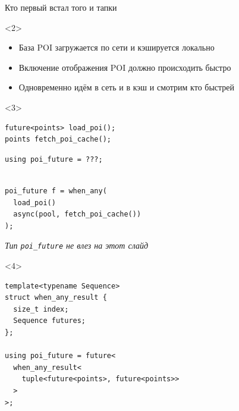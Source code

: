 \documentclass[aspectratio=169,hyperref={unicode},17pt]{beamer}
\begin{document}
\begin{frame}[fragile,t]{Кто первый встал того и тапки}
\begin{onlyenv}<2>
\begin{itemize}
 \item База POI загружается по сети и кэшируется локально
 \item Включение отображения POI должно происходить быстро
 \item Одновременно идём в сеть и в кэш и смотрим кто быстрей
\end{itemize}
\end{onlyenv}
\begin{onlyenv}<3>
\begin{lstlisting}[style=cppcode,aboveskip=0pt,belowskip=0pt]
future<points> load_poi();
points fetch_poi_cache();
\end{lstlisting}
\begin{lstlisting}[style=cppcode,backgroundcolor=\color{gray!30},aboveskip=0pt,belowskip=0pt]
using poi_future = ???;
\end{lstlisting}
\begin{lstlisting}[style=cppcode,aboveskip=0pt,belowskip=0pt]

poi_future f = when_any(
  load_poi()
  async(pool, fetch_poi_cache())
);
\end{lstlisting}
\textit{\footnotesize{Тип \texttt{poi\_future} не влез на этот слайд}}
\end{onlyenv}
\begin{onlyenv}<4>
\begin{lstlisting}[style=cppcode]
template<typename Sequence>
struct when_any_result {
  size_t index;
  Sequence futures;
};

using poi_future = future<
  when_any_result<
    tuple<future<points>, future<points>>
  >
>;
\end{lstlisting}
\end{onlyenv}
\end{frame}
\end{document}
